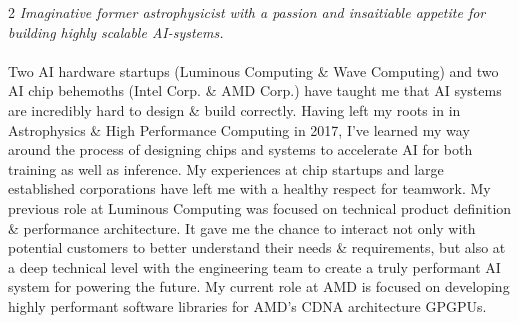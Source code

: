 \documentclass[10pt,a4paper]{article}
\begin{document}
\vspace{-1.3em}  %
\begin{multicols}{2}  %
\noindent \emph{Imaginative former astrophysicist with a passion and insaitiable appetite for building highly scalable AI-systems.}
\\
\\
Two AI hardware startups (Luminous Computing \& Wave Computing) and two AI chip behemoths (Intel Corp. \& AMD Corp.) have taught me that AI systems are incredibly hard to design \& build correctly. Having left my roots in in Astrophysics \& High Performance Computing in 2017, I've learned my way around the process of designing chips and systems to accelerate AI for both training as well as inference. My experiences at chip startups and large established corporations have left me with a healthy respect for teamwork. My previous role at Luminous Computing was focused on technical product definition \& performance architecture. It gave me the chance to interact not only with potential customers to better understand their needs \& requirements, but also at a deep technical level with the engineering team to create a truly performant AI system for powering the future. My current role at AMD is focused on developing highly performant software libraries for AMD's CDNA architecture GPGPUs.





\end{multicols}
\end{document}
